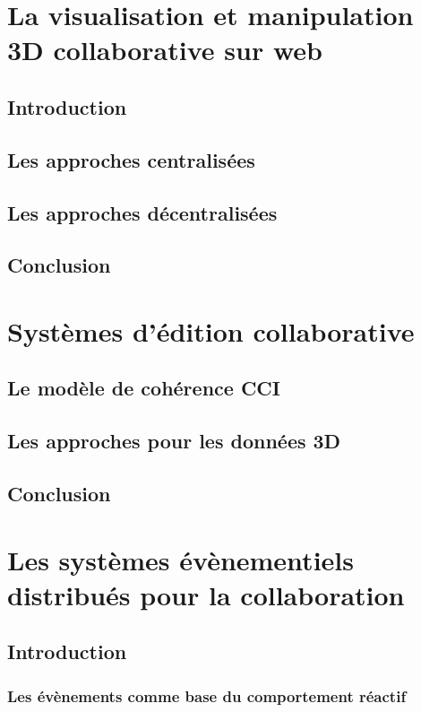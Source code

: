 
\section{La visualisation et manipulation 3D collaborative sur web}
	\subsection{Introduction}
	\subsection{Les approches centralisées}
	\subsection{Les approches décentralisées}
	\subsection{Conclusion}

\section{Systèmes d'édition collaborative}
	\subsection{Le modèle de cohérence CCI}
	\subsection{Les approches pour les données 3D}
	\subsection{Conclusion}


\section{Les systèmes évènementiels distribués pour la collaboration}

	\subsection{Introduction}
	\subsubsection{Les évènements comme base du comportement réactif}
